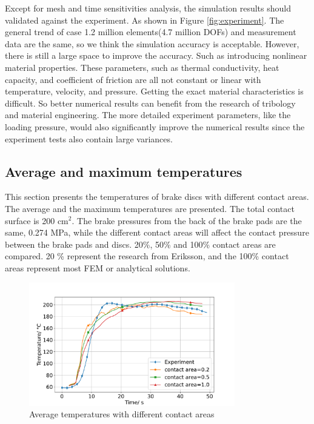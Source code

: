 Except for mesh and time sensitivities analysis, the simulation results should validated against the experiment. As shown in Figure \ref{fig:experiment}. The general trend of case 1.2 million elements(4.7 million DOFs) and measurement data are the same, so we think the simulation accuracy is acceptable. However, there is still a large space to improve the accuracy. Such as introducing nonlinear material properties. These parameters, such as thermal conductivity, heat capacity, and coefficient of friction are all not constant or linear with temperature, velocity, and pressure. Getting the exact material characteristics is difficult. So better numerical results can benefit from the research of tribology and material engineering. The more detailed experiment parameters, like the loading pressure, would also significantly improve the numerical results since the experiment tests also contain large variances.



\subsection*{Average and maximum temperatures}

This section presents the temperatures of brake discs with different contact areas. The average and the maximum temperatures are presented.
The total contact surface is 200 cm$^2$. The brake pressures from the back of the brake pads are the same, 0.274 MPa, while the different contact areas will affect the contact pressure between the brake pads and discs. 20\%, 50\% and 100\% contact areas are compared. 20 \% represent the research from Eriksson\cite{eriksson_nature_2002}, and the 100\% contact areas represent most FEM or analytical solutions.

\begin{figure}[h]
    \centering
    \includegraphics[width=0.8\textwidth]{book/chapters/zhang/graphics/T_ave_dc.pdf}
    \caption{Average temperatures with different contact areas}
    \label{fig:T_ave}
\end{figure}

